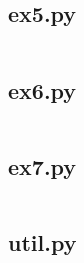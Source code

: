 \documentclass[10pt,a4paper,oneside,onecolumn]{article}
\begin{document}
\subsection{ex5.py}\label{app:ex5}
\inputminted{python}{../src/ex5.py}

\subsection{ex6.py}\label{app:ex6}
\inputminted{python}{../src/ex6.py}

\subsection{ex7.py}\label{app:ex7}
\inputminted{python}{../src/ex7.py}

\subsection{util.py}\label{app:util}
\inputminted{python}{../src/util.py}
\end{document}
